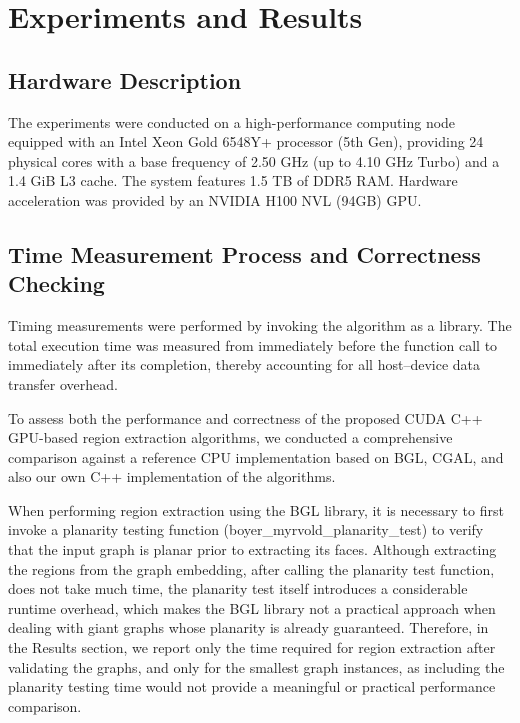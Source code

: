 \section{Experiments and Results}

\subsection{Hardware Description}

The experiments were conducted on a high-performance computing node equipped with an Intel Xeon Gold 6548Y+ processor (5th Gen), providing 24 physical cores with a base frequency of 2.50 GHz (up to 4.10 GHz Turbo) and a 1.4 GiB L3 cache. The system features 1.5 TB of DDR5 RAM. Hardware acceleration was provided by an NVIDIA H100 NVL (94GB) GPU.

\subsection{Time Measurement Process and Correctness Checking}
Timing measurements were performed by invoking the algorithm as a library. The total execution time was measured from immediately before the function call to immediately after its completion, thereby accounting for all host–device data transfer overhead.

To assess both the performance and correctness of the proposed CUDA C++ GPU-based region extraction algorithms, we conducted a comprehensive comparison against a reference CPU implementation based on BGL, CGAL, and also our own C++ implementation of the algorithms.

When performing region extraction using the BGL library, it is necessary to first invoke a planarity testing function (boyer\_myrvold\_planarity\_test) to verify that the input graph is planar prior to extracting its faces. Although extracting the regions from the graph embedding, after calling the planarity test function, does not take much time, the planarity test itself introduces a considerable runtime overhead, which makes the BGL library not a practical approach when dealing with giant graphs whose planarity is already guaranteed. Therefore, in the Results section, we report only the time required for region extraction after validating the graphs, and only for the smallest graph instances, as including the planarity testing time would not provide a meaningful or practical performance comparison.


